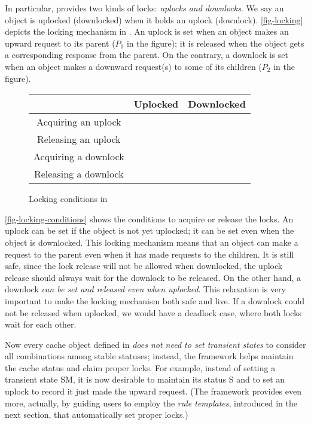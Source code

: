 In particular, \hemiola{} provides two kinds of locks: \emph{uplocks and downlocks}.
We say an object is uplocked (downlocked) when it holds an uplock (downlock).
\autoref{fig-locking} depicts the locking mechanism in \hemiola{}.
An uplock is set when an object makes an upward request to its parent ($P_1$ in the figure); it is released when the object gets a corresponding response from the parent.
On the contrary, a downlock is set when an object makes a downward request(s) to some of its children ($P_2$ in the figure).

\begin{figure}[h]
  \centering
  \renewcommand{\arraystretch}{1.2}
  \newcommand{\lockyes}{\cmark}
  \newcommand{\lockno}{\xmark}
  \begin{tabular}{ccc}
    \hline
    & Uplocked & Downlocked\\
    \hline
    Acquiring an uplock & \lockno & \lockyes\\
    Releasing an uplock & \lockyes & \lockno\\
    Acquiring a downlock & \lockyes & \lockno\\
    Releasing a downlock & \lockyes & \lockyes\\
    \hline
  \end{tabular}
  \caption{Locking conditions in \hemiola{}}
  \label{fig-locking-conditions}
\end{figure}

\autoref{fig-locking-conditions} shows the conditions to acquire or release the locks.
An uplock can be set if the object is not yet uplocked; it can be set even when the object is downlocked.
This locking mechanism means that an object can make a request to the parent even when it has made requests to the children.
It is still safe, since the lock release will not be allowed when downlocked, \ie{} the uplock release should always wait for the downlock to be released.
On the other hand, a downlock \emph{can be set and released even when uplocked}.
This relaxation is very important to make the locking mechanism both safe and live.
If a downlock could not be released when uplocked, we would have a deadlock case, where both locks wait for each other.

Now every cache object defined in \hemiola{} \emph{does not need to set transient states} to consider all combinations among stable statuses;
instead, the framework helps maintain the cache status and claim proper locks.
For example, instead of setting a transient state SM, it is now desirable to maintain its status S and to set an uplock to record it just made the upward request.
(The framework provides even more, actually, by guiding users to employ the \emph{rule templates}, introduced in the next section, that automatically set proper locks.)

